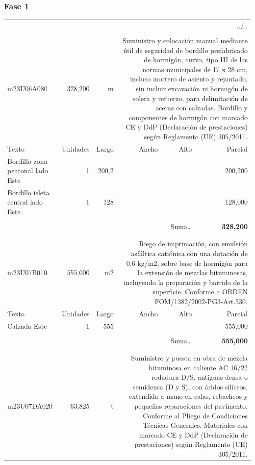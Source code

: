 \documentclass{book}%
\begin{document}
\subsubsection{Fase 1}%
\begin{longtable}{lrrrrr}%
\multicolumn{6}{r}{../..}\\%
\endfoot%
\endlastfoot%
&&&&&\\%
m23U06A080&   328,200& m&\multicolumn{3}{p{6cm}}{\scriptsize Suministro y colocación manual mediante útil de seguridad de bordillo prefabricado de hormigón, curvo, tipo III de las normas municipales de 17 x 28 cm, incluso mortero de asiento y rejuntado, sin incluir excavación ni hormigón de solera y refuerzo, para delimitación de aceras con calzadas. Bordillo y componentes de hormigón con marcado CE y DdP (Declaración de prestaciones) según Reglamento (UE) 305/2011.\normalsize}\\%
Texto&Unidades&Largo&Ancho&Alto&Parcial\\%
\hline%
\multicolumn{1}{p{3.5cm}}{Bordillo  zona peatonal lado Este}&1&200,2&&&   200,200\\%
\multicolumn{1}{p{3.5cm}}{Bordillo  isleta central lado Este}&1&128&&&   128,000\\%
&&&&&\\%
\multicolumn{5}{r}{Suma\ldots}&\textbf{   328,200}\\%
\hline%
&&&&&\\%
&&&&&\\%
m23U07B010&   555,000& m2&\multicolumn{3}{p{6cm}}{\scriptsize Riego de imprimación, con emulsión asfáltica catiónica con una dotación de 0,6 kg/m2, sobre base de hormigón para la extensión de mezclas bituminosas, incluyendo la preparación y barrido de la superficie. Conforme a ORDEN FOM/1382/2002-PG3-Art.530.\normalsize}\\%
Texto&Unidades&Largo&Ancho&Alto&Parcial\\%
\hline%
\multicolumn{1}{p{3.5cm}}{Calzada Este}&1&555&&&   555,000\\%
&&&&&\\%
\multicolumn{5}{r}{Suma\ldots}&\textbf{   555,000}\\%
\hline%
&&&&&\\%
&&&&&\\%
m23U07DA020&    63,825& t&\multicolumn{3}{p{6cm}}{\scriptsize Suministro y puesta en obra de mezcla bituminosa en caliente AC 16/22 rodadura D/S, antiguas densa o semidensa (D y S), con áridos silíceos, extendida a mano en calas, rebacheos y pequeñas reparaciones del pavimento. Conforme al Pliego de Condiciones Técnicas Generales. Materiales con marcado CE y DdP (Declaración de prestaciones) según Reglamento (UE) 305/2011.\normalsize}\\%

\end{longtable}
\end{document}
